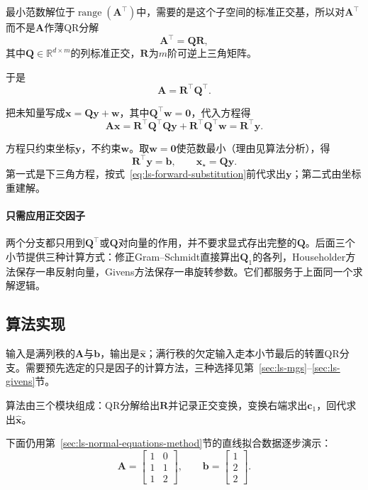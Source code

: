 最小范数解位于$\operatorname{range}(\bm A^\top)$中，需要的是这个子空间的标准正交基，所以对$\bm A^\top$而不是$\bm A$作薄QR分解
\begin{equation}
  \bm A^\top=\bm Q\bm R ,
 \label{eq:ls-qr-transpose-factorization}
\end{equation}
其中$\bm Q\in\mathbb R^{d\times m}$的列标准正交，$\bm R$为$m$阶可逆上三角矩阵。

于是
\[
  \bm A=\bm R^\top\bm Q^\top .
\]

把未知量写成$\bm x=\bm Q\bm y+\bm w$，其中$\bm Q^\top\bm w=\bm0$，代入方程得
\[
 \bm A\bm x=\bm R^\top\bm Q^\top\bm Q\bm y+\bm R^\top\bm Q^\top\bm w=\bm R^\top\bm y .
\]

方程只约束坐标$\bm y$，不约束$\bm w$。取$\bm w=\bm0$使范数最小（理由见算法分析），得
\begin{equation}
 \bm R^\top\bm y=\bm b,\qquad \bm x_\star=\bm Q\bm y .
 \label{eq:ls-qr-min-norm}
\end{equation}
第一式是下三角方程，按式~\eqref{eq:ls-forward-substitution}前代求出$\bm y$；第二式由坐标重建解。

\paragraph{只需应用正交因子}
两个分支都只用到$\bm Q^\top$或$\bm Q$对向量的作用，并不要求显式存出完整的$\bm Q$。后面三个小节提供三种计算方式：修正Gram--Schmidt直接算出$\bm Q_1$的各列，Householder方法保存一串反射向量，Givens方法保存一串旋转参数。它们都服务于上面同一个求解逻辑。

\subsection{算法实现}

输入是满列秩的$\bm A$与$\bm b$，输出是$\hat{\bm x}$；满行秩的欠定输入走本小节最后的转置QR分支。需要预先选定的只是因子的计算方法，三种选择见第~\ref{sec:ls-mgs}--\ref{sec:ls-givens}节。

算法由三个模块组成：QR分解给出$\bm R$并记录正交变换，变换右端求出$\bm c_1$，回代求出$\hat{\bm x}$。

下面仍用第~\ref{sec:ls-normal-equations-method}节的直线拟合数据逐步演示：
\[
  \bm A=\begin{bmatrix}1&0\\1&1\\1&2\end{bmatrix},\qquad \bm b=\begin{bmatrix}1\\2\\2\end{bmatrix}.
\]

